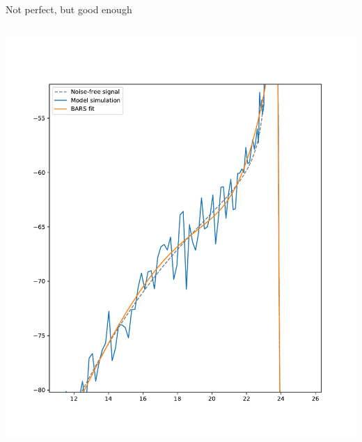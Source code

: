 \documentclass[presentation]{beamer}
\begin{document}
\begin{frame}[plain,label={sec:org4176b49}]{Not perfect, but good enough}
\begin{columns}
\begin{column}{0.5\columnwidth}
\begin{center}
\includegraphics[width=1.1\textwidth]{./barsbad3.pdf}
\end{center}
\end{column}


\end{columns}
\end{frame}
\end{document}
